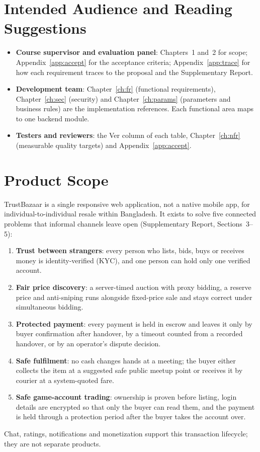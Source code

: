 \documentclass[11pt,a4paper]{report}
\begin{document}
\section{Intended Audience and Reading Suggestions}
\begin{itemize}[nosep]
    \item \textbf{Course supervisor and evaluation panel}: Chapters~1 and~2 for scope; Appendix~\ref{app:accept} for the acceptance criteria; Appendix~\ref{app:trace} for how each requirement traces to the proposal and the Supplementary Report.
    \item \textbf{Development team}: Chapter~\ref{ch:fr} (functional requirements), Chapter~\ref{ch:sec} (security) and Chapter~\ref{ch:params} (parameters and business rules) are the implementation references. Each functional area maps to one backend module.
    \item \textbf{Testers and reviewers}: the Ver column of each table, Chapter~\ref{ch:nfr} (measurable quality targets) and Appendix~\ref{app:accept}.
\end{itemize}

\section{Product Scope}
TrustBazaar is a single responsive web application, not a native mobile app, for individual-to-individual resale within Bangladesh. It exists to solve five connected problems that informal channels leave open (Supplementary Report, Sections~3--5):
\begin{enumerate}[nosep]
    \item \textbf{Trust between strangers}: every person who lists, bids, buys or receives money is identity-verified (KYC), and one person can hold only one verified account.
    \item \textbf{Fair price discovery}: a server-timed auction with proxy bidding, a reserve price and anti-sniping runs alongside fixed-price sale and stays correct under simultaneous bidding.
    \item \textbf{Protected payment}: every payment is held in escrow and leaves it only by buyer confirmation after handover, by a timeout counted from a recorded handover, or by an operator's dispute decision.
    \item \textbf{Safe fulfilment}: no cash changes hands at a meeting; the buyer either collects the item at a suggested safe public meetup point or receives it by courier at a system-quoted fare.
    \item \textbf{Safe game-account trading}: ownership is proven before listing, login details are encrypted so that only the buyer can read them, and the payment is held through a protection period after the buyer takes the account over.
\end{enumerate}
Chat, ratings, notifications and monetization support this transaction lifecycle; they are not separate products.
\end{document}
